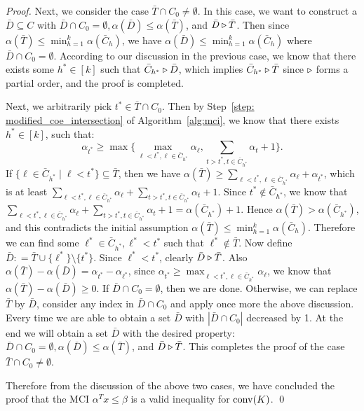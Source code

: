 \begin{proof}
\smallskip

Next, we consider the case $\bar T \cap C_0 \neq \emptyset$.
In this case, we want to construct a $\bar D \subseteq C$ with $\bar D \cap C_0 = \emptyset, \alpha(\bar D) \leq \alpha(\bar T)$, and $\bar D \triangleright \bar T$. Then since $\alpha(\bar T) \leq \min_{h=1}^k\alpha(\bar C_h)$, we have $\alpha(\bar D) \leq \min_{h=1}^k\alpha(\bar C_h)$ where $\bar D \cap C_0 = \emptyset$. According to our discussion in the previous case, we know that there exists some $h^* \in [k]$ such that $\bar C_{h^*} \triangleright \bar D$, which implies $\bar C_{h^*} \triangleright \bar T$ since $\triangleright$ forms a partial order, and the proof is completed.

Next, we arbitrarily pick $t^* \in \bar T \cap C_0$. 
Then by Step~\ref{step: modified_coe_intersection} of Algorithm~\ref{alg:mci}, we know that there exists $h^* \in [k]$, such that:
$$\alpha_{t^*} \geq \max \big\{ \max_{\ell <t^*, \ell \in \bar C_{h^*}} \alpha_\ell, \sum_{t>t^*, t \in \bar C_{h^*}} \alpha_t + 1 \big\}.
$$
If $\{\ell \in \bar C_{h^*} \mid \ell < t^*\} \subseteq \bar T$,
then we have $\alpha(\bar T) \geq \sum_{\ell < t^*, \ell \in \bar C_{h^*}} \alpha_\ell + \alpha_{t^*}$, which is at least $\sum_{\ell < t^*, \ell \in \bar C_{h^*}} \alpha_\ell + \sum_{t>t^*, t \in \bar C_{h^*}} \alpha_t + 1$. Since $t^* \notin \bar C_{h^*}$, we know that $\sum_{\ell < t^*, \ell \in \bar C_{h^*}} \alpha_\ell + \sum_{t>t^*, t \in \bar C_{h^*}} \alpha_t + 1 = \alpha(\bar C_{h^*}) + 1$. Hence $\alpha(\bar T) > \alpha(\bar C_{h^*})$, and this contradicts the initial assumption $\alpha(\bar T) \leq \min_{h=1}^k\alpha(\bar C_h)$. 
Therefore we can find some $\ell^* \in \bar C_{h^*}, \ell^* < t^*$ such that $\ell^* \notin \bar T$. 
Now define $\bar D: = \bar T \cup \{\ell^*\} \setminus \{t^*\}$. 
Since $\ell^* < t^*$, clearly $\bar D \triangleright \bar T$. 
Also $\alpha(\bar T) - \alpha(\bar D) = \alpha_{t^*} - \alpha_{\ell^*}$, since $\alpha_{t^*} \geq \max_{\ell<t^*, \ell \in \bar C_{h^*}} \alpha_\ell$, we know that $\alpha(\bar T) - \alpha(\bar D) \geq 0$. 
If $\bar D \cap C_0 = \emptyset$, then we are done. 
Otherwise, we can replace $\bar T$ by $\bar D$, consider any index in $\bar D \cap C_0$ and apply once more the above discussion.
Every time we are able to obtain a set $\bar D$ with $|\bar D \cap C_0|$ decreased by 1.
At the end we will obtain a set $\bar D$ with the desired property: $\bar D \cap C_0 = \emptyset, \alpha(\bar D) \leq \alpha(\bar T)$, and $\bar D \triangleright \bar T$.
This completes the proof of the case $\bar T \cap C_0 \neq \emptyset$.

\smallskip

Therefore from the discussion of the above two cases, we have concluded the proof that the MCI $\alpha^T x \leq \beta$ is a valid inequality for $\operatorname{conv}(K)$. 
\qed \end{proof}



